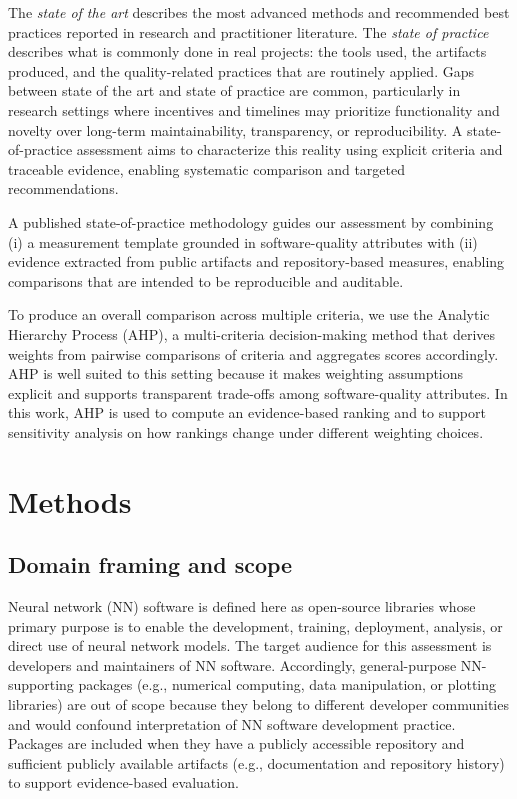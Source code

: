 \documentclass[final,1p,times,authoryear,12pt]{elsarticle}
\providecommand{\wss}[1]{\textcolor{blue}{\textit{#1}}}
\begin{document}
The \emph{state of the art} describes the most advanced methods and recommended best practices reported in research and practitioner
 literature. The \emph{state of practice} describes what is commonly done in real projects: the tools used, the artifacts produced,
  and the quality-related practices that are routinely applied. Gaps between state of the art and state of practice are common,
   particularly in research settings where incentives and timelines may prioritize functionality and 
   novelty over long-term maintainability, transparency, or reproducibility. 
   A state-of-practice assessment aims to characterize this reality using explicit criteria and traceable evidence,
    enabling systematic comparison and targeted recommendations.

A published state-of-practice methodology guides our assessment by combining (i) a measurement template grounded in software-quality
 attributes with (ii) evidence extracted from public artifacts and repository-based measures, enabling comparisons that are intended 
 to be reproducible and auditable. %

To produce an overall comparison across multiple criteria, we use the Analytic Hierarchy Process (AHP), 
a multi-criteria decision-making method that derives weights from pairwise comparisons of criteria and aggregates scores accordingly. 
AHP is well suited to this setting because it makes weighting assumptions explicit and supports transparent trade-offs
 among software-quality attributes. In this work, AHP is used to compute an evidence-based ranking and to support sensitivity analysis
  on how rankings change under different weighting choices.
\section{Methods}\label{methods}

\subsection{Domain framing and scope}\label{scope}

Neural network (NN) software is defined here as open-source libraries whose primary purpose is to enable the development, 
training, deployment, analysis, or direct use of neural network models. The target audience for this assessment is developers
 and maintainers of NN software. Accordingly, general-purpose NN-supporting packages
 (e.g., numerical computing, data manipulation, or plotting libraries) are out of scope because they belong to different developer 
 communities and would confound interpretation of NN software development practice. 
 Packages are included when they have a publicly accessible repository and sufficient publicly available artifacts 
 (e.g., documentation and repository history) to support evidence-based evaluation.
\end{document}
